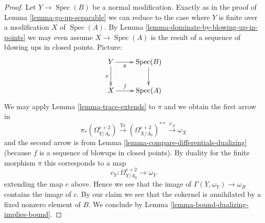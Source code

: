 \documentclass[10pt,a4paper]{amsart}
\theoremstyle{plain}
\theoremstyle{definition}
\theoremstyle{remark}
\numberwithin{equation}{subsection}
\def\Spec{\mathop{\mathrm{Spec}}}
\begin{document}
\begin{proof}
\medskip\noindent
Let $Y \to \Spec(B)$ be a normal modification. Exactly as in the proof of
Lemma \ref{lemma-go-up-separable} we can reduce to the case where $Y$
is finite over a modification $X$ of $\Spec(A)$. By
Lemma \ref{lemma-dominate-by-blowing-up-in-points} we may
even assume $X \to \Spec(A)$ is the result of a sequence of
blowing ups in closed points. Picture:
$$
\xymatrix{
Y \ar[d]_\pi \ar[r]_-g & \Spec(B) \ar[d] \\
X \ar[r]^-f & \Spec(A)
}
$$
We may apply Lemma \ref{lemma-trace-extends} to $\pi$ and
we obtain the first arrow in
$$
\pi_*(\Omega^{e + 2}_{Y/A_0})
\xrightarrow{\text{Tr}}
(\Omega^{e + 2}_{X/A_0})^{**}
\xrightarrow{\varphi_X}
\omega_X
$$
and the second arrow is from
Lemma \ref{lemma-compare-differentials-dualizing}
(because $f$ is a sequence of blowups in closed points).
By duality for the finite morphism $\pi$ this corresponds to a map
$$
c_Y : \Omega^{e + 2}_{Y/A_0} \longrightarrow \omega_Y
$$
extending the map $c$ above. Hence we see that the image of
$\Gamma(Y, \omega_Y) \to \omega_B$ contains the image of $c$.
By our claim we see that the cokernel is annihilated by
a fixed nonzero element of $B$. We conclude by
Lemma \ref{lemma-bound-dualizing-implies-bound}.
\end{proof}
\end{document}
